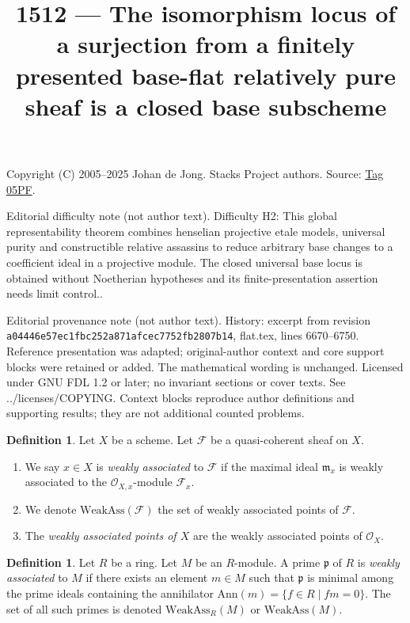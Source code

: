 \documentclass{amsart}
\theoremstyle{plain}
\theoremstyle{definition}
\newtheorem{definition}[subsection]{Definition}
\theoremstyle{remark}
\numberwithin{equation}{subsection}
\begin{document}
\title[Stacks Project, Tag 05PF]{1512 --- The isomorphism locus of a surjection from a finitely presented base-flat relatively pure sheaf is a closed base subscheme}
\maketitle
\noindent Copyright (C) 2005--2025 Johan de Jong. Stacks Project authors. Source: \href{https://stacks.math.columbia.edu/tag/05PF}{Tag 05PF}.

\noindent Editorial difficulty note (not author text). Difficulty H2: This global representability theorem combines henselian projective etale models, universal purity and constructible relative assassins to reduce arbitrary base changes to a coefficient ideal in a projective module. The closed universal base locus is obtained without Noetherian hypotheses and its finite-presentation assertion needs limit control..

\noindent Editorial provenance note (not author text). History: excerpt from revision \texttt{a0444\allowbreak 6e57e\allowbreak c1fbc\allowbreak 252a8\allowbreak 71afc\allowbreak ec775\allowbreak 2fb28\allowbreak 07b14}, flat.tex, lines 6670--6750. Reference presentation was adapted; original-author context and core support blocks were retained or added. The mathematical wording is unchanged. Licensed under GNU FDL 1.2 or later; no invariant sections or cover texts. See ../licenses/COPYING. Context blocks reproduce author definitions and supporting results; they are not additional counted problems.

\begin{definition}
\label{divisors-definition-weakly-associated}
Let $X$ be a scheme.
Let $\mathcal{F}$ be a quasi-coherent sheaf on $X$.
\begin{enumerate}
\item We say $x \in X$ is {\it weakly associated} to $\mathcal{F}$
if the maximal ideal $\mathfrak m_x$ is weakly associated to the
$\mathcal{O}_{X, x}$-module $\mathcal{F}_x$.
\item We denote $\text{WeakAss}(\mathcal{F})$ the set of weakly associated
points of $\mathcal{F}$.
\item The {\it weakly associated points of $X$} are the weakly associated
points of $\mathcal{O}_X$.
\end{enumerate}
\end{definition}

\begin{definition}
\label{algebra-definition-weakly-associated}
Let $R$ be a ring. Let $M$ be an $R$-module.
A prime $\mathfrak p$ of $R$ is {\it weakly associated} to $M$
if there exists an element $m \in M$ such that $\mathfrak p$ is minimal
among the prime ideals containing the annihilator
$\text{Ann}(m) = \{f \in R \mid fm = 0\}$.
The set of all such primes is denoted $\text{WeakAss}_R(M)$
or $\text{WeakAss}(M)$.
\end{definition}
\end{document}
